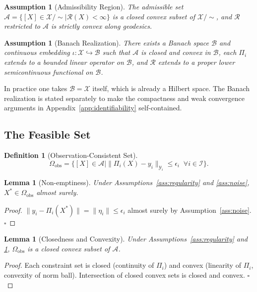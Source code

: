 \documentclass[12pt, oneside]{article}
\newtheorem{lemma}[theorem]{Lemma}
\newtheorem{definition}[theorem]{Definition}
\newtheorem{assumption}[theorem]{Assumption}
\newcommand{\Xmod}{\mathcal{X}/{\sim}}
\begin{document}
\begin{assumption}[Admissibility Region]
\label{ass:admissibility}
The admissible set $\mathcal{A} = \{[X] \in \Xmod \mid \mathcal{R}(X) < \infty\}$
is a closed convex subset of $\Xmod$, and $\mathcal{R}$ restricted to $\mathcal{A}$
is strictly convex along geodesics.
\end{assumption}

\begin{assumption}[Banach Realization]
\label{ass:banach}
There exists a Banach space $\mathcal{B}$ and continuous embedding
$\iota : \mathcal{X} \hookrightarrow \mathcal{B}$ such that $\mathcal{A}$ is closed and
convex in $\mathcal{B}$, each $\Pi_i$ extends to a bounded linear operator on
$\mathcal{B}$, and $\mathcal{R}$ extends to a proper lower semicontinuous functional on
$\mathcal{B}$.
\end{assumption}

In practice one takes $\mathcal{B} = \mathcal{X}$ itself, which is already a Hilbert
space. The Banach realization is stated separately to make the compactness and weak
convergence arguments in Appendix~\ref{app:identifiability} self-contained.

\subsection{The Feasible Set}

\begin{definition}[Observation-Consistent Set]
\[
\Omega_{\mathrm{obs}} = \{ [X] \in \mathcal{A} \mid
\|\Pi_i(X) - y_i\|_{\mathcal{Y}_i} \le \epsilon_i \;\; \forall i \in \mathcal{I} \}.
\]
\end{definition}

\begin{lemma}[Non-emptiness]
Under Assumptions~\ref{ass:regularity} and \ref{ass:noise}, $X^* \in \Omega_{\mathrm{obs}}$
almost surely.
\end{lemma}
\begin{proof}
$\|y_i - \Pi_i(X^*)\| = \|\eta_i\| \le \epsilon_i$ almost surely by Assumption~\ref{ass:noise}.
$\square$
\end{proof}

\begin{lemma}[Closedness and Convexity]
Under Assumptions~\ref{ass:regularity} and \ref{ass:admissibility},
$\Omega_{\mathrm{obs}}$ is a closed convex subset of $\mathcal{A}$.
\end{lemma}
\begin{proof}
Each constraint set is closed (continuity of $\Pi_i$) and convex (linearity of $\Pi_i$,
convexity of norm ball). Intersection of closed convex sets is closed and convex.
$\square$
\end{proof}
\end{document}
